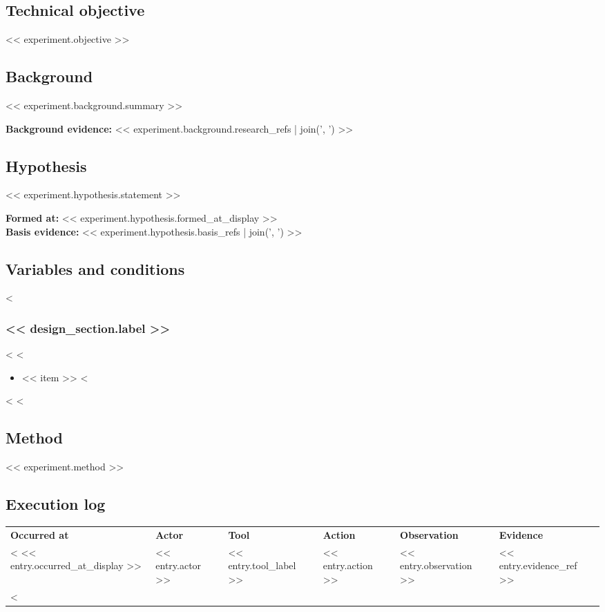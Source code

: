 \documentclass[11pt]{article}
\begin{document}
\subsection{Technical objective}
<< experiment.objective >>

\subsection{Background}
<< experiment.background.summary >>

\textbf{Background evidence:} << experiment.background.research_refs | join(', ') >>

\subsection{Hypothesis}
<< experiment.hypothesis.statement >>

\textbf{Formed at:} << experiment.hypothesis.formed_at_display >>\\
\textbf{Basis evidence:} << experiment.hypothesis.basis_refs | join(', ') >>

\subsection{Variables and conditions}
<%
\subsubsection{<< design_section.label >>}
<%
<%
\begin{itemize}
<%
\item << item >>
<%
\end{itemize}
<%
<%

\subsection{Method}
<< experiment.method >>

\subsection{Execution log}
\small
{}
\noindent\begin{xltabular}{\textwidth}{@{}L{3.2cm}L{1.5cm}L{1.7cm}L{2.7cm}Y L{1.4cm}@{}}
\textbf{Occurred at} & \textbf{Actor} & \textbf{Tool} & \textbf{Action} & \textbf{Observation} & \textbf{Evidence} \\
<%
<< entry.occurred_at_display >> & << entry.actor >> & << entry.tool_label >> & << entry.action >> & << entry.observation >> & << entry.evidence_ref >> \\
<%
\end{xltabular}
\normalsize
\end{document}
